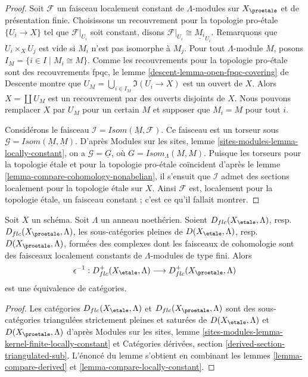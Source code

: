 \begin{proof}
Soit $\mathcal{F}$ un faisceau localement constant de $\Lambda$-modules
sur $X_\proetale$ et de présentation finie. Choisissons un recouvrement pour la topologie pro-\'etale
$\{U_i \to X\}$ tel que $\mathcal{F}|_{U_i}$ soit constant, disons
$\mathcal{F}|_{U_i} \cong \underline{M_i}_{U_i}$.
Remarquons que $U_i \times_X U_j$ est vide si $M_i$ n'est pas isomorphe
à $M_j$.
Pour tout $\Lambda$-module $M$, posons $I_M = \{i \in I \mid M_i \cong M\}$.
Comme les recouvrements pour la topologie pro-\'etale sont des recouvrements fpqc, le
lemme \ref{descent-lemma-open-fpqc-covering} de Descente
montre que $U_M = \bigcup_{i \in I_M} \Im(U_i \to X)$
est un ouvert de $X$. Alors $X = \coprod U_M$ est un recouvrement par des ouverts
disjoints de $X$. Nous pouvons remplacer $X$ par $U_M$ pour un certain $M$ et
supposer que $M_i = M$ pour tout $i$.

\medskip\noindent
Considérons le faisceau $\mathcal{I} = \mathit{Isom}(\underline{M}, \mathcal{F})$.
Ce faisceau est un torseur sous
$\mathcal{G} = \mathit{Isom}(\underline{M}, \underline{M})$.
D'après Modules sur les sites, lemme \ref{sites-modules-lemma-locally-constant},
on a $\mathcal{G} = \underline{G}$,
où $G = \mathit{Isom}_\Lambda(M, M)$.
Puisque les torseurs pour la topologie \'etale
et pour la topologie pro-\'etale coïncident d'après le
lemme \ref{lemma-compare-cohomology-nonabelian},
il s'ensuit que $\mathcal{I}$ admet des sections localement pour la topologie \'etale sur $X$.
Ainsi $\mathcal{F}$ est, localement pour la topologie \'etale, un faisceau constant ; c'est
ce qu'il fallait montrer.
\end{proof}

\begin{lemma}
\label{lemma-compare-locally-constant-derived}
Soit $X$ un schéma. Soit $\Lambda$ un anneau noethérien.
Soient $D_{flc}(X_\etale, \Lambda)$, resp.\ $D_{flc}(X_\proetale, \Lambda)$,
les sous-catégories pleines de
$D(X_\etale, \Lambda)$, resp.\ $D(X_\proetale, \Lambda)$,
formées des complexes dont les faisceaux de cohomologie sont des faisceaux localement
constants de $\Lambda$-modules de type fini. Alors
$$
\epsilon^{-1} :
D_{flc}^+(X_\etale, \Lambda)
\longrightarrow
D_{flc}^+(X_\proetale, \Lambda)
$$
est une équivalence de catégories.
\end{lemma}

\begin{proof}
Les catégories $D_{flc}(X_\etale, \Lambda)$ et $D_{flc}(X_\proetale, \Lambda)$
sont des sous-catégories triangulées strictement pleines et saturées de
$D(X_\etale, \Lambda)$ et $D(X_\proetale, \Lambda)$
d'après Modules sur les sites, lemme
\ref{sites-modules-lemma-kernel-finite-locally-constant}
et
Catégories dérivées, section \ref{derived-section-triangulated-sub}.
L'énoncé du lemme s'obtient en combinant les
lemmes \ref{lemma-compare-derived} et
\ref{lemma-compare-locally-constant}.
\end{proof}


